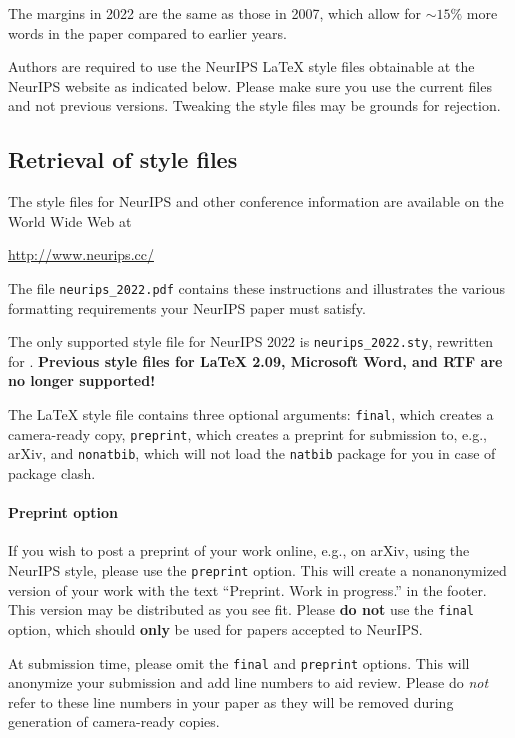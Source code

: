 \documentclass{article}
\begin{document}
The margins in 2022 are the same as those in 2007, which allow for $\sim$$15\%$
more words in the paper compared to earlier years.


Authors are required to use the NeurIPS \LaTeX{} style files obtainable at the
NeurIPS website as indicated below. Please make sure you use the current files
and not previous versions. Tweaking the style files may be grounds for
rejection.


\subsection{Retrieval of style files}


The style files for NeurIPS and other conference information are available on
the World Wide Web at
\begin{center}
  \url{http://www.neurips.cc/}
\end{center}
The file \verb+neurips_2022.pdf+ contains these instructions and illustrates the
various formatting requirements your NeurIPS paper must satisfy.


The only supported style file for NeurIPS 2022 is \verb+neurips_2022.sty+,
rewritten for \LaTeXe{}.  \textbf{Previous style files for \LaTeX{} 2.09,
  Microsoft Word, and RTF are no longer supported!}


The \LaTeX{} style file contains three optional arguments: \verb+final+, which
creates a camera-ready copy, \verb+preprint+, which creates a preprint for
submission to, e.g., arXiv, and \verb+nonatbib+, which will not load the
\verb+natbib+ package for you in case of package clash.


\paragraph{Preprint option}
If you wish to post a preprint of your work online, e.g., on arXiv, using the
NeurIPS style, please use the \verb+preprint+ option. This will create a
nonanonymized version of your work with the text ``Preprint. Work in progress.''
in the footer. This version may be distributed as you see fit. Please \textbf{do
  not} use the \verb+final+ option, which should \textbf{only} be used for
papers accepted to NeurIPS.


At submission time, please omit the \verb+final+ and \verb+preprint+
options. This will anonymize your submission and add line numbers to aid
review. Please do \emph{not} refer to these line numbers in your paper as they
will be removed during generation of camera-ready copies.
\end{document}
